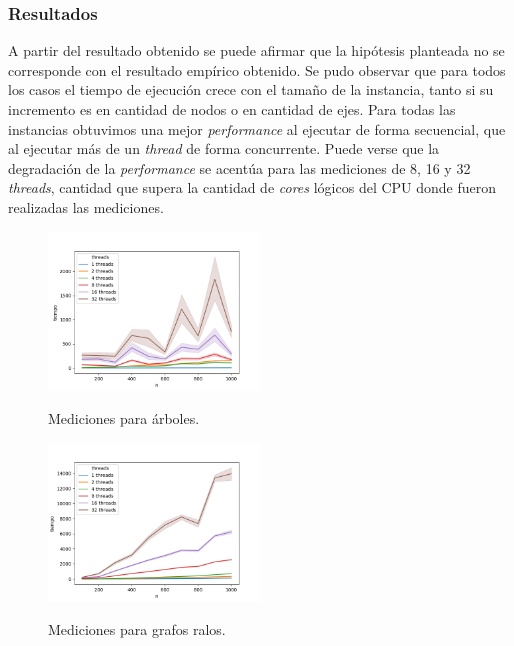 \subsubsection{Resultados}
A partir del resultado obtenido se puede afirmar que la hipótesis planteada no se corresponde
con el resultado empírico obtenido.
Se pudo observar que para todos los casos el tiempo de ejecución crece con el
tamaño de la instancia, tanto si su incremento es en cantidad de nodos o en
cantidad de ejes.
Para todas las instancias obtuvimos una mejor
\textit{performance} al ejecutar de forma secuencial, que al ejecutar más de un
\textit{thread} de forma
concurrente.
Puede verse que la degradación de la \textit{performance} se acentúa para las
mediciones de 8, 16 y 32 \textit{threads}, cantidad que supera la cantidad de
\textit{cores} lógicos del CPU donde fueron realizadas las mediciones.

\begin{figure}[h]
\caption{Mediciones para árboles.}
\centering
\includegraphics[width=0.5\textwidth]{imagenes/arbol.png} \\%
\label{fig:arboles}
\end{figure}

\begin{figure}[h]
\caption{Mediciones para grafos ralos.}
\centering
\includegraphics[width=0.5\textwidth]{imagenes/ralo.png} \\%
\label{fig:ralos}
\end{figure}

